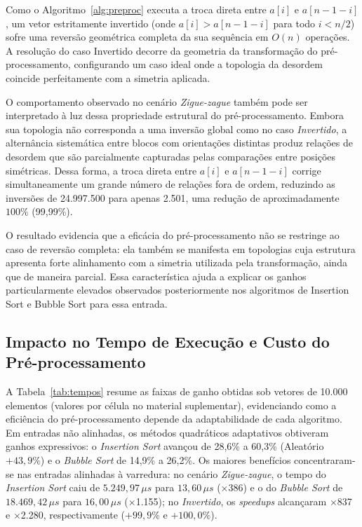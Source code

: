 \documentclass[portuguese]{sbc2025}%
\begin{document}
Como o Algoritmo~\ref{alg:preproc} executa a troca direta entre $a[i]$ e $a[n-1-i]$, um vetor estritamente invertido (onde $a[i] > a[n-1-i]$ para todo $i < n/2$) sofre uma reversão geométrica completa da sua sequência em $O(n)$ operações. A resolução do caso Invertido decorre da geometria da transformação do pré-processamento, configurando um caso ideal onde a topologia da desordem coincide perfeitamente com a simetria aplicada.

O comportamento observado no cenário \emph{Zigue-zague} também pode ser interpretado à luz dessa propriedade estrutural do pré-processamento. Embora sua topologia não corresponda a uma inversão global como no caso \emph{Invertido}, a alternância sistemática entre blocos com orientações distintas produz relações de desordem que são parcialmente capturadas pelas comparações entre posições simétricas. Dessa forma, a troca direta entre $a[i]$ e $a[n-1-i]$ corrige simultaneamente um grande número de relações fora de ordem, reduzindo as inversões de 24.997.500 para apenas 2.501, uma redução de aproximadamente $100\%$ (99{,}99\%).

O resultado evidencia que a eficácia do pré-processamento não se restringe ao caso de reversão completa: ela também se manifesta em topologias cuja estrutura apresenta forte alinhamento com a simetria utilizada pela transformação, ainda que de maneira parcial. Essa característica ajuda a explicar os ganhos particularmente elevados observados posteriormente nos algoritmos de Insertion Sort e Bubble Sort para essa entrada.

\subsection{Impacto no Tempo de Execução e Custo do Pré-processamento}

A Tabela~\ref{tab:tempos} resume as faixas de ganho obtidas sob vetores de 10.000 elementos (valores por célula no material suplementar), evidenciando como a eficiência do pré-processamento depende da adaptabilidade de cada algoritmo. Em entradas não alinhadas, os métodos quadráticos adaptativos obtiveram ganhos expressivos: o \emph{Insertion Sort} avançou de 28{,}6\% a 60{,}3\% (Aleatório $+43{,}9\%$) e o \emph{Bubble Sort} de 14{,}9\% a 26{,}2\%. Os maiores benefícios concentraram-se nas entradas alinhadas à varredura: no cenário \emph{Zigue-zague}, o tempo do \emph{Insertion Sort} caiu de $5.249{,}97\,\mu s$ para $13{,}60\,\mu s$ ($\times$386) e o do \emph{Bubble Sort} de $18.469{,}42\,\mu s$ para $16{,}00\,\mu s$ ($\times$1.155); no \emph{Invertido}, os \emph{speedups} alcançaram $\times$837 e $\times$2.280, respectivamente ($+99{,}9\%$ e $+100{,}0\%$).
\end{document}

